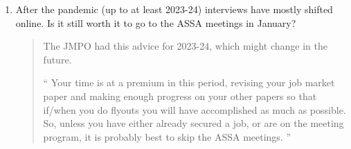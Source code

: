 \documentclass{\classes/econtex}
\begin{document}
\begin{enumerate}
\item After the pandemic (up to at least 2023-24) interviews have mostly shifted online. Is it still worth it to go to the ASSA meetings in January?

\begin{quote}
	The JMPO had this advice for 2023-24, which might change in the future.
	
	``
	Your time is at a premium in this period, revising your job market paper and making enough progress on your other papers so that if/when you do flyouts you will have accomplished as much as possible.  So, unless you have either already secured a job, or are on the meeting program, it is probably best to skip the ASSA meetings.
	''
\end{quote}

\end{enumerate}
\end{document}
